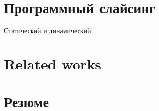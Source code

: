 \section{Программный слайсинг}
Статический и динамический 
\section{Related works}
\section{Резюме}

